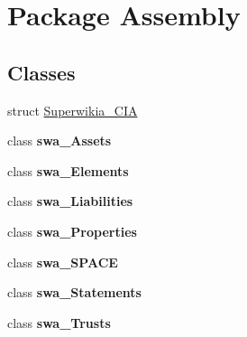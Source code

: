 \hypertarget{namespace_assembly}{\section{Package Assembly}
\label{namespace_assembly}
}
\subsection*{Classes}
\begin{DoxyCompactItemize}
\item 
struct \hyperlink{struct_assembly_1_1_superwikia___c_i_a}{Superwikia\+\_\+\+C\+I\+A}
\item 
class {\bfseries swa\+\_\+\+Assets}
\item 
class {\bfseries swa\+\_\+\+Elements}
\item 
class {\bfseries swa\+\_\+\+Liabilities}
\item 
class {\bfseries swa\+\_\+\+Properties}
\item 
class {\bfseries swa\+\_\+\+S\+P\+A\+C\+E}
\item 
class {\bfseries swa\+\_\+\+Statements}
\item 
class {\bfseries swa\+\_\+\+Trusts}
\end{DoxyCompactItemize}
